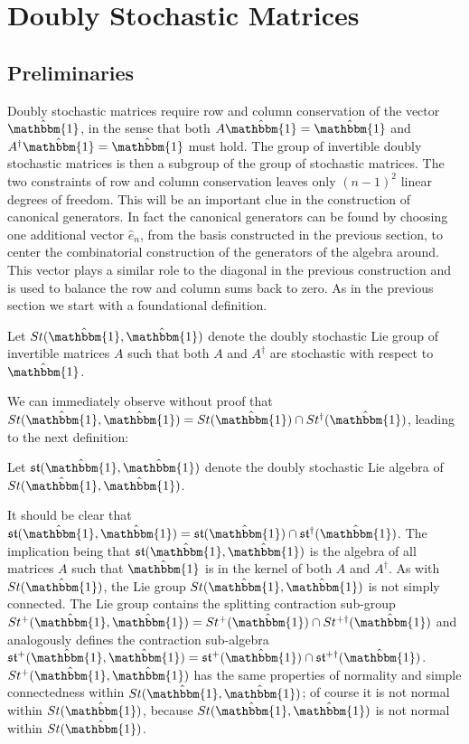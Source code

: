 \section{Doubly Stochastic Matrices}
\subsection{Preliminaries}
Doubly stochastic matrices require row and column conservation of the vector $\hat{\mathbbm{1}}$, 
in the sense that both $A \hat{\mathbbm{1}} = \hat{\mathbbm{1}}$ and $A^\dagger \hat{\mathbbm{1}} = \hat{\mathbbm{1}}$ 
must hold. The group of invertible doubly stochastic matrices is then a subgroup of the
group of stochastic matrices. The two constraints of row and column conservation leaves only
$\left(n - 1\right)^2$ linear degrees of freedom. This will be an important clue in the
construction of canonical generators. In fact the canonical generators can be found by
choosing one additional vector $\hat{e}_n$, from the basis constructed in the previous
section, to center the combinatorial construction of the generators of the algebra around.
This vector plays a similar role to the diagonal in the previous construction and is used to
balance the row and column sums back to zero. As in the previous section we start with a 
foundational definition.
\begin{definition}
	Let $St(\hat{\mathbbm{1}}, \hat{\mathbbm{1}})$ denote the doubly stochastic 
	Lie group of invertible matrices $A$ such that both $A$ and $A^\dagger$ are 
	stochastic with respect to $\hat{\mathbbm{1}}$.
\end{definition}
We can immediately observe without proof that $St(\hat{\mathbbm{1}}, \hat{\mathbbm{1}}) = St(\hat{\mathbbm{1}}) \cap St^\dagger(\hat{\mathbbm{1}})$,
leading to the next definition:
\begin{definition}
	Let $\mathfrak{st}(\hat{\mathbbm{1}}, \hat{\mathbbm{1}})$ denote the doubly 
	stochastic Lie algebra of $St(\hat{\mathbbm{1}},\hat{\mathbbm{1}})$.
\end{definition}
It should be clear that $\mathfrak{st}(\hat{\mathbbm{1}}, \hat{\mathbbm{1}}) = \mathfrak{st}(\hat{\mathbbm{1}}) \cap \mathfrak{st}^\dagger(\hat{\mathbbm{1}})$.
The implication being that $\mathfrak{st}(\hat{\mathbbm{1}}, \hat{\mathbbm{1}})$ is the
algebra of all matrices $A$ such that $\hat{\mathbbm{1}}$ is in the kernel of both $A$ and $A^\dagger$.
As with $St(\hat{\mathbbm{1}})$, the Lie group $St(\hat{\mathbbm{1}}, \hat{\mathbbm{1}})$ is
not simply connected. The Lie group contains the splitting contraction sub-group $St^{+}(\hat{\mathbbm{1}}, \hat{\mathbbm{1}}) = St^{+}(\hat{\mathbbm{1}}) \cap St^{+\dagger}(\hat{\mathbbm{1}})$
and analogously defines the contraction sub-algebra $\mathfrak{st}^{+}(\hat{\mathbbm{1}}, \hat{\mathbbm{1}}) = \mathfrak{st}^{+}(\hat{\mathbbm{1}}) \cap \mathfrak{st}^{+\dagger}(\hat{\mathbbm{1}})$. 
$St^{+}(\hat{\mathbbm{1}}, \hat{\mathbbm{1}})$ has the same properties of normality and 
simple connectedness within $St(\hat{\mathbbm{1}}, \hat{\mathbbm{1}})$; of course it is not
normal within $St(\hat{\mathbbm{1}})$, because $St(\hat{\mathbbm{1}}, \hat{\mathbbm{1}})$ is
not normal within $St(\hat{\mathbbm{1}})$.
